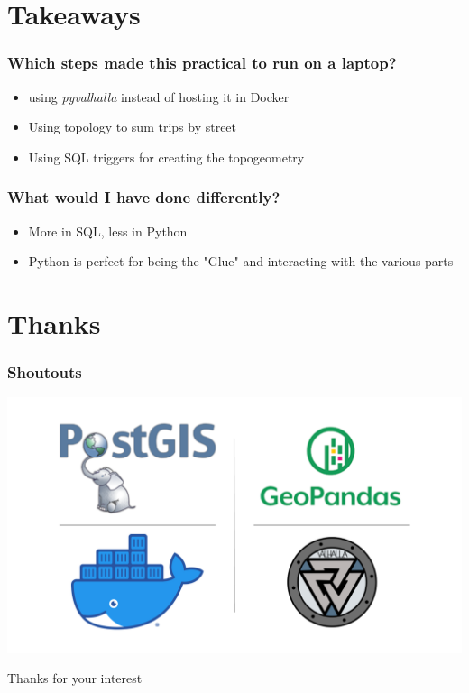 \documentclass{beamer}
\begin{document}
\section{Takeaways}

\begin{frame}
    \frametitle{Which steps made this practical to run on a laptop?}

    \begin{itemize}
        \item using \emph{pyvalhalla} instead of hosting it in Docker
        \item Using topology to sum trips by street
        \item Using SQL triggers for creating the topogeometry 
    \end{itemize}
\end{frame}
\begin{frame}
    \frametitle{What would I have done differently?}

    \begin{itemize}
        \item More in SQL, less in Python
        \item Python is perfect for being the "Glue" and interacting with the various parts

    \end{itemize}
\end{frame}

\section{Thanks}

\begin{frame}
    \frametitle{Shoutouts}
\includegraphics[width=\textwidth]{logos_thanks.png}
\end{frame}
\begin{frame}
    Thanks for your interest
\end{frame}
\end{document}
